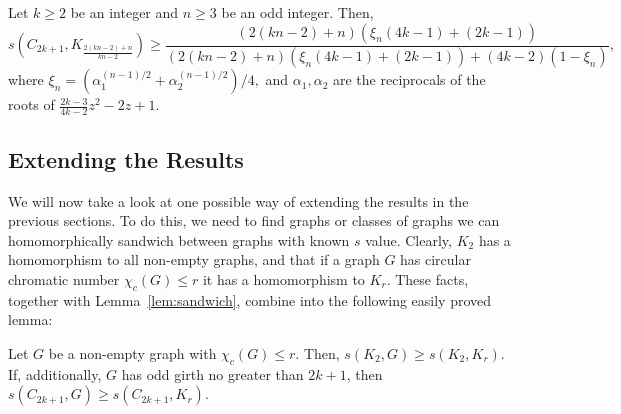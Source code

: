 \documentclass[11pt,a4paper]{article}
\begin{document}
\begin{proposition} \label{th:qisfunny}
Let $k \geq 2$ be an integer and $n \geq 3$ be an odd integer. Then,
\begin{equation}
s(C_{2k+1},K_{\frac{2(kn-2)+n}{kn-2}}) \geq \frac{(2(kn-2)+n)(\xi_n(4k-1)+(2k-1))}{(2(kn-2)+n)(\xi_n(4k-1)+(2k-1))+(4k-2)(1-\xi_n)},
\end{equation}
where
$\xi_n = 
\left(\alpha_1^{(n-1)/2} + \alpha_2^{(n-1)/2}\right)/4,$
and $\alpha_1, \alpha_2$ are the reciprocals of the roots of
$\frac{2k-3}{4k-2} z^2 - 2z + 1$.
\end{proposition}






\subsection{Extending the Results} \label{sec:apply}

We will now take a look at one possible way of extending the results in
the previous sections. To do this, we need to find graphs or classes of
graphs we can homomorphically sandwich between graphs with known
$s$ value. Clearly, $K_2$ has a homomorphism to all non-empty
graphs, and that if a graph $G$ has circular chromatic number $\chi_c(G)
\leq r$ it has a homomorphism to $K_r$. These facts, together with
Lemma~\ref{lem:sandwich}, combine into the following easily proved
lemma:

\begin{lemma}
\label{lem:circlesandwich}
Let $G$ be a non-empty graph with $\chi_c(G) \leq r$. Then, $s(K_2,G)
\geq s(K_2,K_r)$.
If, additionally, $G$ has odd girth no greater than $2k+1$, 
then $s(C_{2k+1},G) \geq s(C_{2k+1},K_r)$.
\end{lemma}
\end{document}
